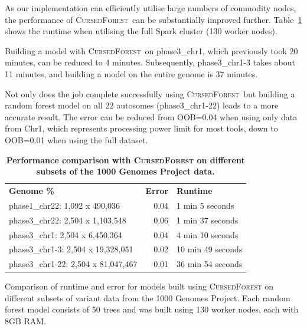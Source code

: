 \documentclass[10pt,letterpaper]{article}
\newlength\savedwidth
\newcommand\thickhline{\noalign{\global\savedwidth\arrayrulewidth\global\arrayrulewidth 2pt}%
\hline
\noalign{\global\arrayrulewidth\savedwidth}}
\newcommand{\cursedforest}{\textsc{CursedForest}\xspace}
\begin{document}
As our implementation can efficiently utilise large numbers of commodity nodes, the performance of \cursedforest\ can be substantially improved further. 
Table~\ref{cursedforesttable} shows the runtime when utilising the full Spark cluster (130 worker nodes). 

Building a model with \cursedforest\ on phase3\_chr1, which previously took 20 minutes, can be reduced to 4 minutes. 
Subsequently, phase3\_chr1-3 takes about 11 minutes, and building a
model on the entire genome is 37 minutes. 

Not only does the job complete successfully using \cursedforest\, but building a random
forest model on all 22 autosomes (phase3\_chr1-22)  leads to a more accurate result. 
The error can be reduced from OOB=0.04 when using only data from Chr1, which represents processing power limit for most tools, down to OOB=0.01 when using the full dataset. 


\begin{table}[!ht]
\begin{minipage}{\textwidth}
\centering
\caption{ {\bf Performance comparison with \cursedforest on different subsets of the 1000 Genomes Project data.}}
\begin{tabular}{| l | r | l |}
\hline
{\bf Genome \%} & {\bf Error} & {\bf Runtime} \\ \thickhline
phase1\_chr22: 1,092 x 490,036 & 0.04 & 1 min 5 seconds \\ \hline
phase3\_chr22: 2,504 x 1,103,548 & 0.06 & 1 min 37 seconds \\ \hline
phase3\_chr1: 2,504 x 6,450,364 & 0.04 & 4 min 10 seconds \\ \hline
phase3\_chr1-3: 2,504 x 19,328,051 & 0.02 & 10 min 49 seconds \\ \hline
phase3\_chr1-22: 2,504 x 81,047,467 & 0.01 & 36 min 54 seconds \\ \hline
\end{tabular}
\begin{flushleft} 
Comparison of runtime and error for models built using \cursedforest on different subsets of variant data 
from the 1000 Genomes Project.
Each random forest model consists of 50 trees and was built using 130 worker nodes, each with 8GB RAM.
\end{flushleft}
\label{cursedforesttable}
\end{minipage}
\end{table}
\end{document}

